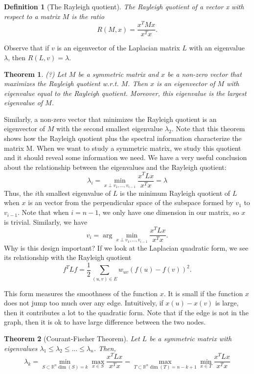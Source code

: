 \documentclass[11pt]{article}
\newtheorem{theorem}{Theorem}[section]
\newtheorem{definition}{Definition}[section]
\begin{document}
\begin{definition}[The Rayleigh quotient]
    The Rayleigh quotient of a vector x with respect to a
matrix $M$ is the ratio
\[
R(M, x) = \frac{x^TMx}{x^Tx}.
\]
\end{definition}

Observe that if $v$ is an eigenvector of the Laplacian matrix $L$ with an eigenvalue $\lambda$, then $R(L, v) = \lambda$.

\begin{theorem}(?)
 Let $M$ be a symmetric matrix and $x$ be a non-zero vector that maximizes the Rayleigh quotient w.r.t. $M$. Then $x$ is an eigenvector of $M$ with eigenvalue equal to the Rayleigh quotient. Moreover, this eigenvalue is the largest eigenvalue of $M$.    
\end{theorem}

Similarly, a non-zero vector that minimizes the Rayleigh quotient is an eigenvector of $M$ with the second smallest eigenvalue $\lambda_2$.
Note that this theorem shows how the Rayleigh quotient plus the spectral information characterize the matrix M. When we want to study a symmetric matrix, we study this quotient and it should reveal some information we need. We have a very useful conclusion about the relationship between the eigenvalues and the Rayleigh quotient:
\[
\lambda_i = \min_{x \perp v_1,...,v_{i-1}} \frac{x^T L x}{x^Tx} = \lambda
\]
Thus, the $i$th smallest eigenvalue of $L$ is the minimum Rayleigh quotient of $L$ when $x$ is an vector from the perpendicular space of the subspace formed by $v_1$ to $v_{i-1}$. Note that when $i = n-1$, we only have one dimension in our matrix, so $x$ is trivial. Similarly, we have
\[
v_i = \arg \min_{x \perp v_1,...,v_{i-1}} \frac{x^T L x}{x^T x}.
\]
Why is this design important? If we look at the Laplacian quadratic form, we see its relationship with the Rayleigh quotient
\[
f^T L f = \frac{1}{2}\sum_{(u,v) \in E} w_{uv}(f(u) - f(v))^2.
\]

This form measures the smoothness of the function $x$. It is small if the function $x$ does not jump too much over any edge. Intuitively, if $x(u) - x(v)$ is large, then it contributes a lot to the quadratic form. Note that if the edge is not in the graph, then it is ok to have large difference between the two nodes.


\begin{theorem}[Courant-Fischer Theorem]
Let $L$ be a symmetric matrix with eigenvalues $\lambda_1 \leq \lambda_2 \leq ... \leq \lambda_n$. Then,
\[
\lambda_k = \min_{S \subset \mathbb{R}^n \dim(S)=k} \max_{x \in S} \frac{x^T L x}{x^T x} 
= \max_{T \subset \mathbb{R}^n \dim(T)=n-k+1} \min_{x \in T} \frac{x^T L x}{x^T x}
\]
\end{theorem}
\end{document}
